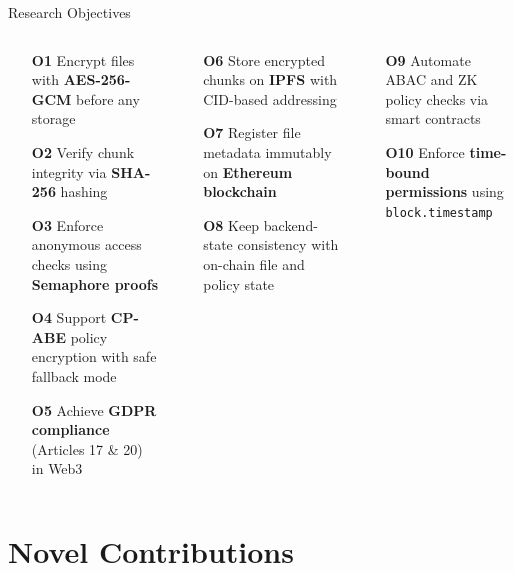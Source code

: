 \documentclass[aspectratio=169]{beamer}
\begin{document}
\begin{frame}{Research Objectives}
\begin{columns}[t]
\begin{tcolorbox}[redbox, title=\textbf{Security Objectives}]
\scriptsize
\begin{itemize}
  \item[\textbf{O1}] Encrypt files with \textbf{AES-256-GCM} before any storage
  \item[\textbf{O2}] Verify chunk integrity via \textbf{SHA-256} hashing
  \item[\textbf{O3}] Enforce anonymous access checks using \textbf{Semaphore proofs}
  \item[\textbf{O4}] Support \textbf{CP-ABE} policy encryption with safe fallback mode
  \item[\textbf{O5}] Achieve \textbf{GDPR compliance} (Articles 17 \& 20) in Web3
\end{itemize}
\end{tcolorbox}
\begin{tcolorbox}[bluebox, title=\textbf{Storage Objectives}]
\scriptsize
\begin{itemize}
  \item[\textbf{O6}] Store encrypted chunks on \textbf{IPFS} with CID-based addressing
  \item[\textbf{O7}] Register file metadata immutably on \textbf{Ethereum blockchain}
  \item[\textbf{O8}] Keep backend-state consistency with on-chain file and policy state
\end{itemize}
\end{tcolorbox}
\vspace{0.15cm}
\begin{tcolorbox}[greenbox, title=\textbf{Governance Objectives}]
\scriptsize
\begin{itemize}
  \item[\textbf{O9}] Automate ABAC and ZK policy checks via smart contracts
  \item[\textbf{O10}] Enforce \textbf{time-bound permissions} using \texttt{block.timestamp}
\end{itemize}
\end{tcolorbox}
\end{columns}
\end{frame}

\section{Novel Contributions}
\end{document}
